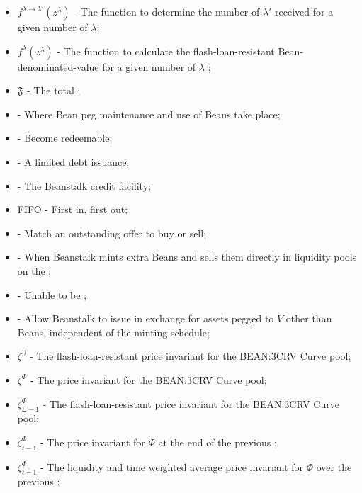 \documentclass[class=article, crop=false]{standalone}
\begin{document}
\begin{itemize}[topsep=0pt, itemsep=3pt,leftmargin=16pt]
    \item[] $f^{\lambda \rightarrow \lambda'}(z^{\lambda})$ - \hypertarget{ht83}{The function to determine the number of $\lambda'$ received for  a given number of $\lambda$};
    \item[] $f^{\lambda}(z^{\lambda})$ - \hypertarget{ht84}{The function to calculate the flash-loan-resistant Bean-denominated-value for a given number of $\lambda$ };
    \item[] $\mathfrak{F}$ - \hypertarget{ht85}{The total };
    \item[]  - \hypertarget{ht86}{Where Bean peg maintenance and use of Beans take place};
    \item[]  - \hypertarget{ht87}{Become redeemable};
    \item[]  - \hypertarget{ht88}{A limited debt issuance};
    \item[]  - \hypertarget{ht89}{The Beanstalk credit facility};
    \item[] FIFO - \hypertarget{ht89}{First in, first out};
    \item[]  - \hypertarget{ht90}{Match an outstanding offer to buy or sell};
    \item[]  - \hypertarget{ht91}{When Beanstalk mints extra Beans and sells them directly in liquidity pools on the };
    \item[]  - \hypertarget{ht92}{Unable to be };
    \item[]  - \hypertarget{ht93}{Allow Beanstalk to issue  in exchange for assets pegged to $V$ other than Beans, independent of the  minting schedule};
    \item[] $\zeta^{\daleth}$ - \hypertarget{ht94}{The flash-loan-resistant price invariant for the BEAN:3CRV Curve pool};
    \item[] $\zeta^{\Phi}$ - \hypertarget{ht95}{The price invariant for the BEAN:3CRV Curve pool};
    \item[] $\zeta^{\Phi}_{\Xi-1}$ - \hypertarget{ht96}{The flash-loan-resistant price invariant for the BEAN:3CRV Curve pool};
    \item[] $\zeta^{\Phi}_{t-1}$ - \hypertarget{ht97}{The price invariant for $\Phi$ at the end of the previous };
    \item[] $\zeta^{\Phi}_{\overline{t-1}}$ - \hypertarget{ht98}{The liquidity and time weighted average price invariant for $\Phi$ over the previous };

\end{itemize}
\end{document}
